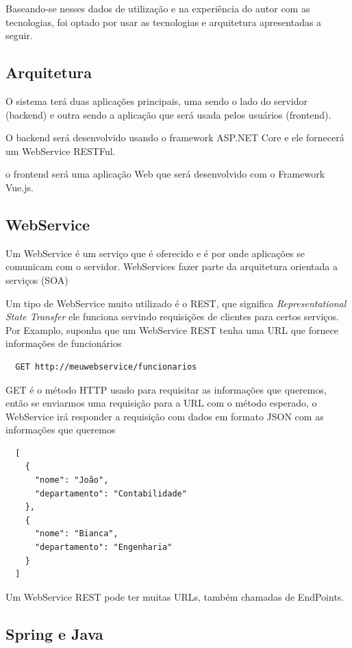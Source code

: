 \documentclass[12pt]{article}
\begin{document}
Baseando-se nesses dados de utilização e na experiência do autor com as tecnologias, foi optado por usar as tecnologias e arquitetura
apresentadas a seguir.

\subsection{Arquitetura}

O sistema terá duas aplicações principais, uma sendo o lado do servidor (backend) e outra sendo
a aplicação que será usada pelos usuários (frontend).

O backend será desenvolvido usando o framework ASP.NET Core e
ele fornecerá um WebService RESTFul.

o frontend será uma aplicação Web que será desenvolvido com o Framework Vue.js.

\subsection{WebService}

Um WebService é um serviço que é oferecido e é por onde aplicações se comunicam com o servidor.
WebServices fazer parte da arquitetura orientada a serviços (SOA)

Um tipo de WebService muito utilizado é o REST, que significa
\emph{Representational State Transfer} ele funciona servindo requisições de clientes
para certos serviços. Por Examplo, suponha que um WebService REST tenha uma URL que fornece
informações de funcionários

\begin{verbatim}
  GET http://meuwebservice/funcionarios
\end{verbatim}

GET é o método HTTP usado para requisitar as informações que queremos, então se enviarmos uma requisição
para a URL com o método esperado, o WebService irá responder a requisição com dados em formato JSON com as informações que queremos

\begin{verbatim}
  [
    {
      "nome": "João",
      "departamento": "Contabilidade"
    },
    {
      "nome": "Bianca",
      "departamento": "Engenharia"
    }
  ]
\end{verbatim}

Um WebService REST pode ter muitas URLs, também chamadas de EndPoints.

\subsection{Spring e Java}
\end{document}
